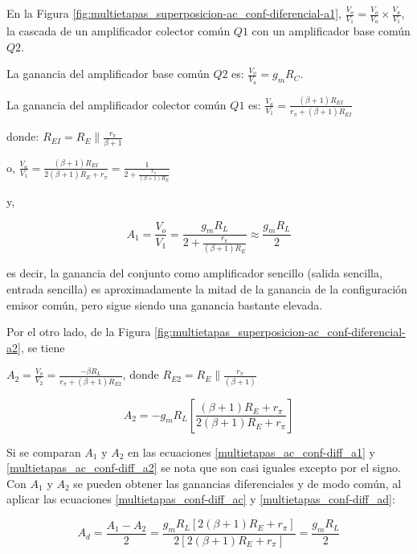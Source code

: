 En la Figura \ref{fig:multietapas_superposicion-ac_conf-diferencial-a1}, \( \frac{V_o}{V_1} = \frac{V_o}{V_a} \times \frac{V_a}{V_1}\), la cascada de un amplificador colector común \( Q1 \) con un amplificador base común \( Q2\).

La ganancia del amplificador base común \( Q2 \) es: \( \frac{V_o}{V_a} = g_m R_C \).

La ganancia del amplificador colector común \( Q1 \) es: \( \frac{V_a}{V_1} = \frac{(\beta+1) R_{EI}}{r_\pi + (\beta+1) R_{EI}} \)

donde: \( R_{EI} = R_E \parallel \frac{r_\pi}{\beta+1} \)

o, \( \frac{V_a}{V_1} = \frac{(\beta+1) R_{EI}}{2 (\beta+1) R_E + r_\pi} = \frac{1}{2 + \frac{r_\pi}{(\beta+1) R_E}} \)

y,

\begin{equation} \label{multietapas_ac_conf-diff_a1}
	A_1 = \frac{V_o}{V_1} = \frac{g_m R_L}{2 + \frac{r_\pi}{(\beta+1) R_E}} \approx \frac{g_m R_L}{2}
\end{equation}

es decir, la ganancia del conjunto como amplificador sencillo (salida sencilla, entrada sencilla) es aproximadamente la mitad de la ganancia de la configuración emisor común, pero sigue siendo una ganancia bastante elevada.

Por el otro lado, de la Figura \ref{fig:multietapas_superposicion-ac_conf-diferencial-a2}, se tiene

\( A_2 = \frac{V_o}{V_2} = \frac{-\beta R_L}{r_\pi + (\beta+1) R_{E2}} \), donde  \( R_{E2} = R_E \parallel \frac{r_\pi}{(\beta+1)} \)

\begin{equation} \label{multietapas_ac_conf-diff_a2}
	A_2 = - g_m R_L \left[ \frac{(\beta+1) R_E + r_\pi}{2 (\beta+1) R_E + r_\pi} \right]
\end{equation}

Si se comparan \( A_1 \) y \( A_2 \) en las ecuaciones \ref{multietapas_ac_conf-diff_a1} y \ref{multietapas_ac_conf-diff_a2} se nota que son casi iguales excepto por el signo. Con \( A_1 \) y \( A_2 \) se pueden obtener las ganancias diferenciales y de modo común, al aplicar las ecuaciones \ref{multietapas_conf-diff_ac} y \ref{multietapas_conf-diff_ad}:

\begin{equation}
	A_d = \frac{A_1 - A_2}{2} = \frac{g_m R_L \left[ 2 (\beta+1) R_E + r_\pi \right]}{2 \left[ 2 (\beta+1) R_E + r_\pi \right]} = \frac{g_m R_L}{2}
\end{equation}

